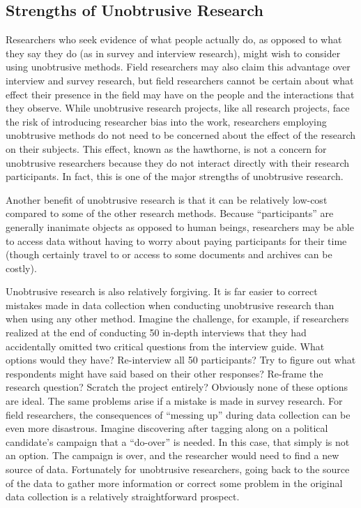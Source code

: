 \subsection{Strengths of Unobtrusive Research}

Researchers who seek evidence of what people actually do, as opposed to what they say they do (as in survey and interview research), might wish to consider using unobtrusive methods. Field researchers may also claim this advantage over interview and survey research, but field researchers cannot be certain about what effect their presence in the field may have on the people and the interactions that they observe. While unobtrusive research projects, like all research projects, face the risk of introducing researcher bias into the work, researchers employing unobtrusive methods do not need to be concerned about the effect of the research on their subjects. This effect, known as the \gls{hawthorne}, is not a concern for unobtrusive researchers because they do not interact directly with their research participants. In fact, this is one of the major strengths of unobtrusive research.

Another benefit of unobtrusive research is that it can be relatively low-cost compared to some of the other research methods. Because ``participants'' are generally inanimate objects as opposed to human beings, researchers may be able to access data without having to worry about paying participants for their time (though certainly travel to or access to some documents and archives can be costly).

Unobtrusive research is also relatively forgiving. It is far easier to correct mistakes made in data collection when conducting unobtrusive research than when using any other method. Imagine the challenge, for example, if researchers realized at the end of conducting 50 in-depth interviews that they had accidentally omitted two critical questions from the interview guide. What options would they have? Re-interview all 50 participants? Try to figure out what respondents might have said based on their other responses? Re-frame the research question? Scratch the project entirely? Obviously none of these options are ideal. The same problems arise if a mistake is made in survey research. For field researchers, the consequences of ``messing up'' during data collection can be even more disastrous. Imagine discovering after tagging along on a political candidate's campaign that a ``do-over'' is needed. In this case, that simply is not an option. The campaign is over, and the researcher would need to find a new source of data. Fortunately for unobtrusive researchers, going back to the source of the data to gather more information or correct some problem in the original data collection is a relatively straightforward prospect.


